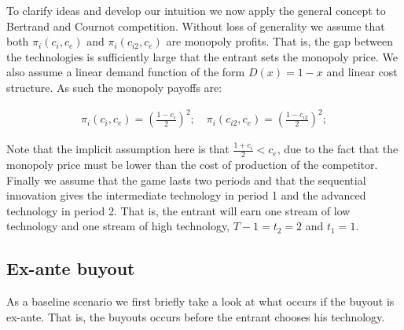 \documentclass[12pt]{report}
\numberwithin{equation}{section}
\begin{document}
To clarify ideas and develop our intuition we now apply the general concept to Bertrand and Cournot competition. Without loss of generality we assume that both $\pi_i(c_i,c_e)$ and
$\pi_i(c_{i2},c_e)$ are monopoly profits. That is, the gap between the technologies is sufficiently large that the entrant sets the monopoly price. We also assume a linear demand function of the form $D(x)=1-x$ and linear cost structure.  As such the monopoly payoffs are: 

\begin{align*}
\pi_i(c_i,c_e) = 
\left(\frac{1-c_i}{2}\right)^2; \quad \pi_i(c_{i2},c_e) = \left(\frac{1-c_{i2}}{2}\right)^2;  
\end{align*}

Note that the implicit assumption here is that $\frac{1+c_i}{2}<c_e$, due to the fact that the monopoly price must be lower than the cost of production of the competitor. Finally we assume that the game lasts two periods and that the sequential innovation gives the intermediate technology in period 1 and the advanced technology in period 2. That is, the entrant will earn one stream of low technology and one stream of high technology, $T-1=t_2=2$ and $t_1=1$.

\subsection{Ex-ante buyout}

As a baseline scenario we first briefly take a look at what occurs if the buyout is ex-ante. That is, the buyouts occurs before the entrant chooses his technology. 
\end{document}
